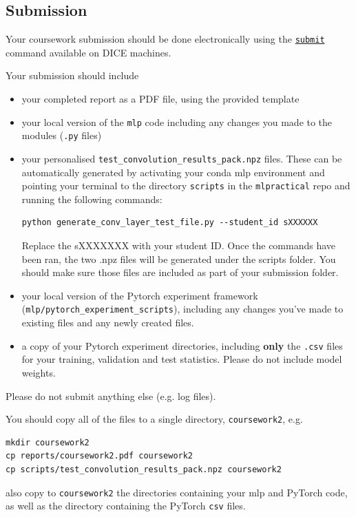 \documentclass[11pt,]{article}
\begin{document}
\subsection{Submission}
\label{sec:submission}

Your coursework submission should be done electronically using the
\href{http://computing.help.inf.ed.ac.uk/submit}{\texttt{submit}}
command available on DICE machines.

Your submission should include

\begin{itemize}

\item
  your completed report as a PDF file, using the provided template
\item
  your local version of the \texttt{mlp} code including any changes
  you made to the modules (\texttt{.py} files)
 \item your personalised \texttt{test\_convolution\_results\_pack.npz} files. These can be automatically generated by activating your conda mlp environment and pointing your terminal to the directory \texttt{scripts} in the \texttt{mlpractical} repo and running the following commands: 
 \begin{verbatim}
python generate_conv_layer_test_file.py --student_id sXXXXXX
\end{verbatim}
Replace the sXXXXXXX with your student ID. Once the commands have been ran, the two .npz files will be generated under the scripts folder. You should make sure those files are included as part of your submission folder.

 \item your local version of the Pytorch experiment framework (\texttt{mlp/pytorch\_experiment\_scripts}), including any changes you've made to existing files and any newly created files.
 \item a copy of your Pytorch experiment directories, including \textbf{only} the \texttt{.csv} files for your training, validation and test statistics. Please do not include model weights.

\end{itemize}
Please do not submit anything else (e.g. log files).

You should copy all of the files to a single directory, \verb+coursework2+, e.g.

\begin{verbatim}
mkdir coursework2
cp reports/coursework2.pdf coursework2
cp scripts/test_convolution_results_pack.npz coursework2
\end{verbatim}
also copy to \texttt{coursework2} the directories containing your mlp and PyTorch code, as well as the directory containing the PyTorch \texttt{csv} files.
\end{document}
